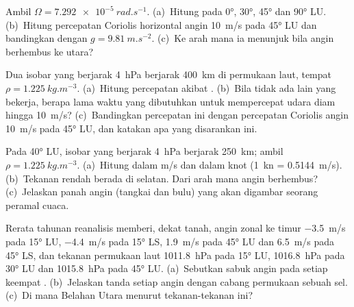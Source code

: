 \begin{exercise}[$\star$]\label{exo:b1:atmospheric-circulation:1}
Ambil $\Omega = \qty{7.292e-5}{rad.s^{-1}}$. (a)~Hitung  pada \ang{0}, \ang{30}, \ang{45} dan \ang{90} LU. (b)~Hitung percepatan Coriolis horizontal angin \qty{10}{m/s} pada \ang{45} LU dan bandingkan dengan $g =
\qty{9.81}{m.s^{-2}}$. (c)~Ke arah mana ia menunjuk bila angin berhembus ke utara?
\end{exercise}

\begin{exercise}[$\star$]\label{exo:b1:atmospheric-circulation:2}
Dua isobar yang berjarak \qty{4}{hPa} berjarak \qty{400}{km} di permukaan laut, tempat $\rho =
\qty{1.225}{kg.m^{-3}}$. (a)~Hitung percepatan akibat . (b)~Bila tidak ada lain yang bekerja, berapa lama waktu yang dibutuhkan untuk mempercepat udara diam hingga \qty{10}{m/s}? (c)~Bandingkan percepatan ini dengan percepatan Coriolis angin \qty{10}{m/s} pada \ang{45} LU, dan katakan apa yang disarankan ini.
\end{exercise}

\begin{exercise}[$\star$]\label{exo:b1:atmospheric-circulation:3}
Pada \ang{40} LU, isobar yang berjarak \qty{4}{hPa} berjarak \qty{250}{km}; ambil $\rho =
\qty{1.225}{kg.m^{-3}}$. (a)~Hitung  dalam \unit{m/s} dan dalam knot
(\qty{1}{kn} = \qty{0.5144}{m/s}). (b)~Tekanan rendah berada di selatan. Dari arah mana angin
berhembus? (c)~Jelaskan panah angin (tangkai dan bulu) yang akan digambar seorang peramal cuaca.
\end{exercise}

\begin{exercise}[$\star$]\label{exo:b1:atmospheric-circulation:4}
Rerata tahunan reanalisis memberi, dekat tanah, angin zonal ke timur
\qty{-3.5}{m/s} pada \ang{15} LU, \qty{-4.4}{m/s} pada \ang{15} LS, \qty{+1.9}{m/s} pada
\ang{45} LU dan \qty{+6.5}{m/s} pada \ang{45} LS, dan tekanan permukaan laut
\qty{1011.8}{hPa} pada \ang{15} LU, \qty{1016.8}{hPa} pada \ang{30} LU dan
\qty{1015.8}{hPa} pada \ang{45} LU. (a)~Sebutkan sabuk angin pada setiap keempat .
(b)~Jelaskan tanda setiap angin dengan cabang permukaan sebuah sel. (c)~Di mana  Belahan Utara menurut tekanan-tekanan ini?
\end{exercise}

